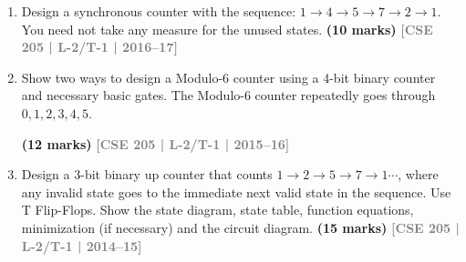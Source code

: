 \documentclass[12pt]{article}
\newcommand{\yr}[1]{\hfill\textcolor{gray}{\small\textbf{[#1]}}}
\newcommand{\mk}[1]{\textcolor{orange!70!black}{\small\textbf{(#1 marks)}}}
\begin{document}
\begin{enumerate}
\item Design a synchronous counter with the sequence: $1 \to 4 \to 5 \to 7 \to 2 \to 1$. You need not take any measure for the unused states.
\mk{10} \yr{CSE 205 | L-2/T-1 | 2016--17}



\item Show two ways to design a Modulo-6 counter using a 4-bit binary counter and necessary basic gates. The Modulo-6 counter repeatedly goes through $0, 1, 2, 3, 4, 5$.

\begin{center}
\end{center}

\mk{12} \yr{CSE 205 | L-2/T-1 | 2015--16}





\item Design a 3-bit binary up counter that counts $1 \to 2 \to 5 \to 7 \to 1\cdots$, where any invalid state goes to the immediate next valid state in the sequence. Use T Flip-Flops. Show the state diagram, state table, function equations, minimization (if necessary) and the circuit diagram.
\mk{15} \yr{CSE 205 | L-2/T-1 | 2014--15}





\end{enumerate}
\end{document}
